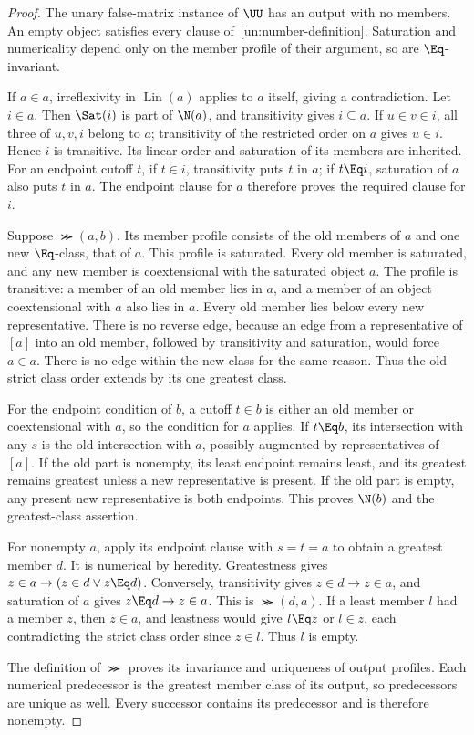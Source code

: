 \begin{proof}
The unary false-matrix instance of $\UU$ has an output with no members.
An empty object satisfies every clause of~\eqref{un:number-definition}.
Saturation and numericality depend only on the member profile of their
argument, so are $\Eq$-invariant.

If $a\in a$, irreflexivity in $\operatorname{Lin}(a)$ applies to $a$
itself, giving a contradiction. Let $i\in a$. Then $\Sat(i)$ is part
of $\N(a)$, and transitivity gives $i\subseteq a$. If $u\in v\in i$,
all three of $u,v,i$ belong to $a$; transitivity of the restricted order
on $a$ gives $u\in i$. Hence $i$ is transitive. Its linear order and
saturation of its members are inherited. For an endpoint cutoff $t$,
if $t\in i$, transitivity puts $t$ in $a$; if $t\Eq i$, saturation of
$a$ also puts $t$ in $a$. The endpoint clause for $a$ therefore proves
the required clause for $i$.

Suppose $\Succ(a,b)$. Its member profile consists of the old members of
$a$ and one new $\Eq$-class, that of $a$. This profile is saturated.
Every old member is saturated, and any new member is coextensional with
the saturated object $a$. The profile is transitive: a member of an old
member lies in $a$, and a member of an object coextensional with $a$
also lies in $a$. Every old member lies below every new representative.
There is no reverse edge, because an edge from a representative of
$[a]$ into an old member, followed by transitivity and saturation, would
force $a\in a$. There is no edge within the new class for the same
reason. Thus the old strict class order extends by its one greatest
class.

For the endpoint condition of $b$, a cutoff $t\in b$ is either an old
member or coextensional with $a$, so the condition for $a$ applies. If
$t\Eq b$, its intersection with any $s$ is the old intersection with
$a$, possibly augmented by representatives of $[a]$. If the old part
is nonempty, its least endpoint remains least, and its greatest remains
greatest unless a new representative is present. If the old part is
empty, any present new representative is both endpoints. This proves
$\N(b)$ and the greatest-class assertion.

For nonempty $a$, apply its endpoint clause with $s=t=a$ to obtain a
greatest member $d$. It is numerical by heredity. Greatestness gives
$z\in a\to(z\in d\lor z\Eq d)$. Conversely, transitivity gives
$z\in d\to z\in a$, and saturation of $a$ gives
$z\Eq d\to z\in a$. This is $\Succ(d,a)$. If a least member $l$
had a member $z$, then $z\in a$, and leastness would give $l\Eq z$
or $l\in z$, each contradicting the strict class order since $z\in l$.
Thus $l$ is empty.

The definition of $\Succ$ proves its invariance and uniqueness of output
profiles. Each numerical predecessor is the greatest member class of
its output, so predecessors are unique as well. Every successor contains
its predecessor and is therefore nonempty.
\end{proof}

